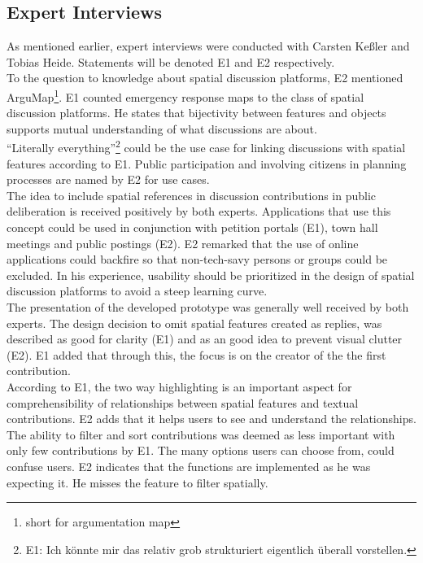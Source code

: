 \subsection{Expert Interviews}
\label{sub:ev_expert_interviews}
As mentioned earlier, expert interviews were conducted with Carsten Ke{\ss}ler and Tobias Heide. Statements will be denoted E1 and E2 respectively.\\
To the question to knowledge about spatial discussion platforms, E2 mentioned ArguMap\footnote{short for argumentation map}. E1 counted emergency response maps to the class of spatial discussion platforms. He states that bijectivity between features and objects supports mutual understanding of what discussions are about.\\
``Literally everything''\footnote{E1: Ich k{\"o}nnte mir das relativ grob strukturiert eigentlich {\"u}berall vorstellen.} could be the use case for linking discussions with spatial features according to E1. Public participation and involving citizens in planning processes are named by E2 for use cases.\\
The idea to include spatial references in discussion contributions in public deliberation is received positively by both experts. Applications that use this concept could be used in conjunction with petition portals (E1), town hall meetings and public postings (E2). E2 remarked that the use of online applications could backfire so that non-tech-savy persons or groups could be excluded. In his experience, usability should be prioritized in the design of spatial discussion platforms to avoid a steep learning curve.\\
The presentation of the developed prototype was generally well received by both experts. The design decision to omit spatial features created as replies, was described as good for clarity (E1) and as an good idea to prevent visual clutter (E2). E1 added that through this, the focus is on the creator of the the first contribution.\\
According to E1, the two way highlighting is an important aspect for comprehensibility of relationships between spatial features and textual contributions. E2 adds that it helps users to see and understand the relationships.\\
The ability to filter and sort contributions was deemed as less important with only few contributions by E1. The many options users can choose from, could confuse users. E2 indicates that the functions are implemented as he was expecting it. He misses the feature to filter spatially.\\
